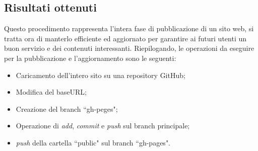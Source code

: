\documentclass[target=bach,aauheader=]{thud}
\begin{document}
\subsection{Risultati ottenuti}
Questo procedimento rappresenta l'intera fase di pubblicazione di un sito web, si tratta ora di manterlo efficiente ed aggiornato per garantire ai futuri utenti un buon servizio e dei contenuti interessanti. 
Riepilogando, le operazioni da eseguire per la pubblicazione e l'aggiornamento sono le seguenti: 
\begin{itemize}
    \item Caricamento dell'intero sito su una repository GitHub;
    \item Modifica del baseURL;
    \item Creazione del branch ``gh-peges";
    \item Operazione di \textit{add}, \textit{commit} e \textit{push} sul branch principale;
    \item \textit{push} della cartella ``public" sul branch ``gh-pages".
\end{itemize}

\end{document}
